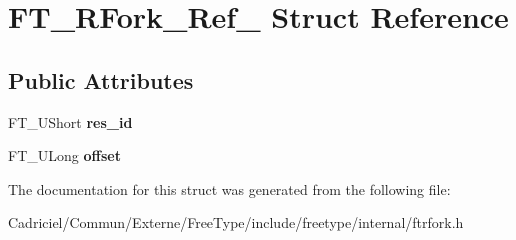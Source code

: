 \hypertarget{struct_f_t___r_fork___ref__}{}\section{F\+T\+\_\+\+R\+Fork\+\_\+\+Ref\+\_\+ Struct Reference}
\label{struct_f_t___r_fork___ref__}
\subsection*{Public Attributes}
\begin{DoxyCompactItemize}
\item 
F\+T\+\_\+\+U\+Short {\bfseries res\+\_\+id}\hypertarget{struct_f_t___r_fork___ref___a7bca14bddf56df7903166b52e19a0500}{}\label{struct_f_t___r_fork___ref___a7bca14bddf56df7903166b52e19a0500}

\item 
F\+T\+\_\+\+U\+Long {\bfseries offset}\hypertarget{struct_f_t___r_fork___ref___af84c349a29b40c42a788927b113f9ecf}{}\label{struct_f_t___r_fork___ref___af84c349a29b40c42a788927b113f9ecf}

\end{DoxyCompactItemize}


The documentation for this struct was generated from the following file\+:\begin{DoxyCompactItemize}
\item 
Cadriciel/\+Commun/\+Externe/\+Free\+Type/include/freetype/internal/ftrfork.\+h\end{DoxyCompactItemize}
